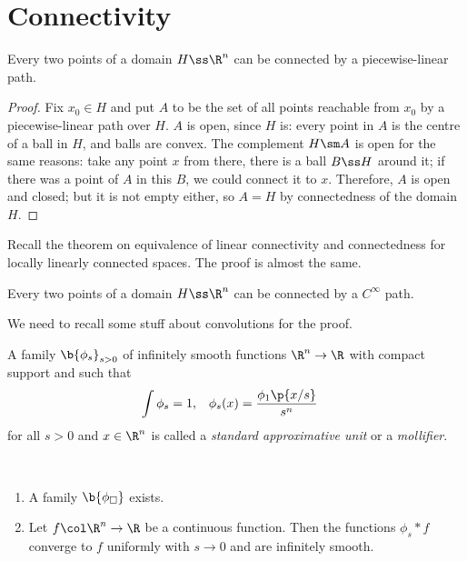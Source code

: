 \section{Connectivity}

\begin{lemma}
  Every two points of a domain $H \ss \R^n$ can be connected by a piecewise-linear path.  
\end{lemma}

\begin{proof}
  Fix $x_0 \in H$ and put $A$ to be the set of all points reachable from $x_0$ by a piecewise-linear path over $H$. $A$ is open, since $H$ is: every point in $A$ is the centre of a ball in $H$, and balls are convex. The complement $H \sm A$ is open for the same reasons: take any point $x$ from there, there is a ball $B \ss H$ around it; if there was a point of $A$ in this $B$, we could connect it to $x$. Therefore, $A$ is open and closed; but it is not empty either, so $A = H$ by connectedness of the domain $H$.
\end{proof}

Recall the theorem on equivalence of linear connectivity and connectedness for locally linearly connected spaces. The proof is almost the same.

\begin{theorem}
  Every two points of a domain $H \ss \R^n$ can be connected by a $C^\infty$ path.   
\end{theorem}

We need to recall some stuff about convolutions for the proof.

\begin{definition}
  A family $\b{\phi_s}_{s > 0}$ of infinitely smooth functions $\R^n \to \R$ with compact support and such that
  \begin{align*}
    \int \phi_s &= 1, &
    \phi_s(x) &= \frac{\phi_1\p{x/s}}{s^n}
  \end{align*}
  for all $s > 0$ and $x \in \R^n$ is called a
  \emph{standard approximative unit} or a \emph{mollifier}.
\end{definition}

\begin{theorem}
  ~\begin{enumerate}
    \item A family $\b{\phi_\square}$ exists.
    \item Let $f \col \R^n \to \R$ be a continuous function.
  Then the functions $\phi_s * f$ converge to $f$ uniformly with $s \to 0$ and are infinitely smooth.
  \end{enumerate}
\end{theorem}

